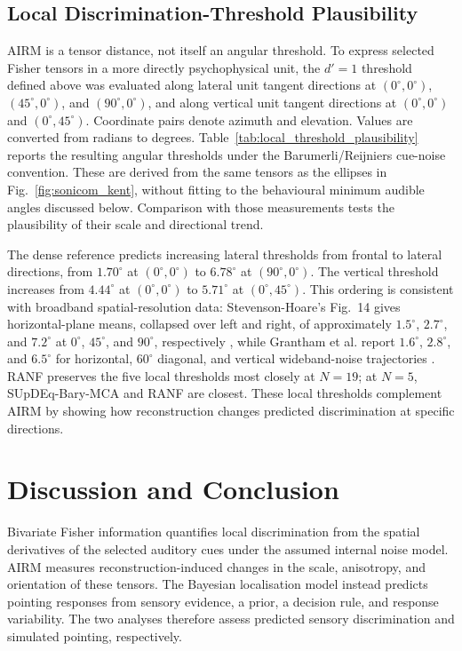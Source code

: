\documentclass[journal]{IEEEtran}
\begin{document}
\subsection{Local Discrimination-Threshold Plausibility}
AIRM is a tensor distance, not itself an angular threshold. To express selected Fisher tensors in a more directly psychophysical unit, the \(d'=1\) threshold defined above was evaluated along lateral unit tangent directions at \((0^\circ,0^\circ)\), \((45^\circ,0^\circ)\), and \((90^\circ,0^\circ)\), and along vertical unit tangent directions at \((0^\circ,0^\circ)\) and \((0^\circ,45^\circ)\). Coordinate pairs denote azimuth and elevation. Values are converted from radians to degrees. Table~\ref{tab:local_threshold_plausibility} reports the resulting angular thresholds under the Barumerli/Reijniers cue-noise convention. These are derived from the same tensors as the ellipses in Fig.~\ref{fig:sonicom_kent}, without fitting to the behavioural minimum audible angles discussed below. Comparison with those measurements tests the plausibility of their scale and directional trend.



The dense reference predicts increasing lateral thresholds from frontal to lateral directions, from \(1.70^\circ\) at \((0^\circ,0^\circ)\) to \(6.78^\circ\) at \((90^\circ,0^\circ)\). The vertical threshold increases from \(4.44^\circ\) at \((0^\circ,0^\circ)\) to \(5.71^\circ\) at \((0^\circ,45^\circ)\). This ordering is consistent with broadband spatial-resolution data: Stevenson-Hoare's Fig.~14 gives horizontal-plane means, collapsed over left and right, of approximately \(1.5^\circ\), \(2.7^\circ\), and \(7.2^\circ\) at \(0^\circ\), \(45^\circ\), and \(90^\circ\), respectively \cite{StevensonHoare2020}, while Grantham et al. report \(1.6^\circ\), \(2.8^\circ\), and \(6.5^\circ\) for horizontal, \(60^\circ\) diagonal, and vertical wideband-noise trajectories \cite{Grantham2003}. RANF preserves the five local thresholds most closely at \(N=19\); at \(N=5\), SUpDEq-Bary-MCA and RANF are closest. These local thresholds complement AIRM by showing how reconstruction changes predicted discrimination at specific directions.

\section{Discussion and Conclusion}

Bivariate Fisher information quantifies local discrimination from the spatial derivatives of the selected auditory cues under the assumed internal noise model. AIRM measures reconstruction-induced changes in the scale, anisotropy, and orientation of these tensors. The Bayesian localisation model instead predicts pointing responses from sensory evidence, a prior, a decision rule, and response variability. The two analyses therefore assess predicted sensory discrimination and simulated pointing, respectively.
\end{document}
